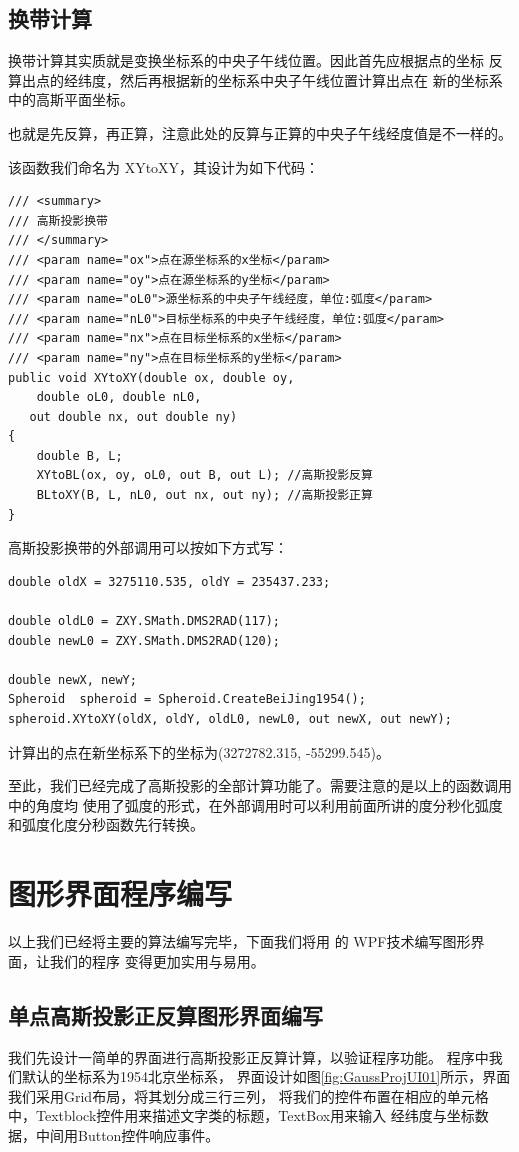 \subsection{换带计算}
换带计算其实质就是变换坐标系的中央子午线位置。因此首先应根据点的坐标
反算出点的经纬度，然后再根据新的坐标系中央子午线位置计算出点在
新的坐标系中的高斯平面坐标。

也就是先反算，再正算，注意此处的反算与正算的中央子午线经度值是不一样的。

该函数我们命名为 XYtoXY，其设计为如下代码：

\begin{lstlisting}
/// <summary>
/// 高斯投影换带
/// </summary>
/// <param name="ox">点在源坐标系的x坐标</param>
/// <param name="oy">点在源坐标系的y坐标</param>
/// <param name="oL0">源坐标系的中央子午线经度，单位:弧度</param>
/// <param name="nL0">目标坐标系的中央子午线经度，单位:弧度</param>
/// <param name="nx">点在目标坐标系的x坐标</param>
/// <param name="ny">点在目标坐标系的y坐标</param>
public void XYtoXY(double ox, double oy,
    double oL0, double nL0,
   out double nx, out double ny)
{
    double B, L;
    XYtoBL(ox, oy, oL0, out B, out L); //高斯投影反算
    BLtoXY(B, L, nL0, out nx, out ny); //高斯投影正算
}
\end{lstlisting}

高斯投影换带的外部调用可以按如下方式写：

\begin{lstlisting}
double oldX = 3275110.535, oldY = 235437.233;

double oldL0 = ZXY.SMath.DMS2RAD(117);
double newL0 = ZXY.SMath.DMS2RAD(120);

double newX, newY;
Spheroid  spheroid = Spheroid.CreateBeiJing1954();
spheroid.XYtoXY(oldX, oldY, oldL0, newL0, out newX, out newY);
\end{lstlisting}

计算出的点在新坐标系下的坐标为(3272782.315, -55299.545)。

至此，我们已经完成了高斯投影的全部计算功能了。需要注意的是以上的函数调用中的角度均
使用了弧度的形式，在外部调用时可以利用前面所讲的度分秒化弧度和弧度化度分秒函数先行转换。

\section{图形界面程序编写}
以上我们已经将主要的算法编写完毕，下面我们将用  \cs  的 WPF技术编写图形界面，让我们的程序
变得更加实用与易用。

\subsection{单点高斯投影正反算图形界面编写}
我们先设计一简单的界面进行高斯投影正反算计算，以验证程序功能。
程序中我们默认的坐标系为1954北京坐标系，
界面设计如图\ref{fig:GaussProjUI01}所示，界面我们采用Grid布局，将其划分成三行三列，
将我们的控件布置在相应的单元格中，Textblock控件用来描述文字类的标题，TextBox用来输入
经纬度与坐标数据，中间用Button控件响应事件。

